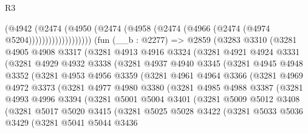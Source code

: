 \begin{lexlean}{R3}
\begin{coremodule}
                        (@4942
                          (@2474
                            (@4950
                              (@2474 (@4958 (@2474 (@4966 (@2474 (@4974 @5204)))))))))))))))))))
    (fun (__b : @2277) =>
    @2859
      (@3283
        @3310
        (@3281
          @4905
          @4908
          @3317
          (@3281
            @4913
            @4916
            @3324
            (@3281
              @4921
              @4924
              @3331
              (@3281
                @4929
                @4932
                @3338
                (@3281
                  @4937
                  @4940
                  @3345
                  (@3281
                    @4945
                    @4948
                    @3352
                    (@3281
                      @4953
                      @4956
                      @3359
                      (@3281
                        @4961
                        @4964
                        @3366
                        (@3281
                          @4969
                          @4972
                          @3373
                          (@3281
                            @4977
                            @4980
                            @3380
                            (@3281
                              @4985
                              @4988
                              @3387
                              (@3281
                                @4993
                                @4996
                                @3394
                                (@3281
                                  @5001
                                  @5004
                                  @3401
                                  (@3281
                                    @5009
                                    @5012
                                    @3408
                                    (@3281
                                      @5017
                                      @5020
                                      @3415
                                      (@3281
                                        @5025
                                        @5028
                                        @3422
                                        (@3281
                                          @5033
                                          @5036
                                          @3429
                                          (@3281
                                            @5041
                                            @5044
                                            @3436

\end{coremodule}
\end{lexlean}
